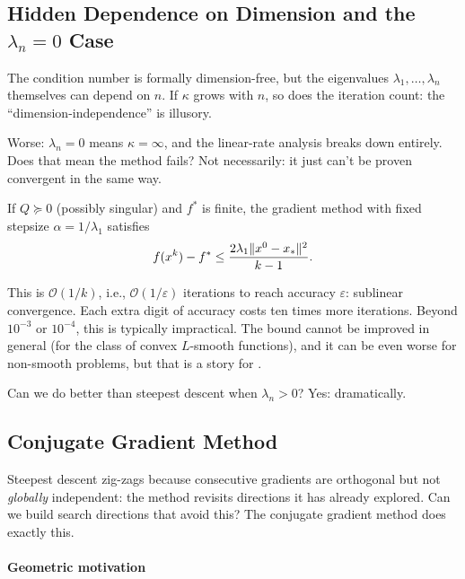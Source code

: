 \subsection{Hidden Dependence on Dimension and the \texorpdfstring{$\lambda_n = 0$}{λₙ = 0} Case}\label{sec:lambda-n-zero}

The condition number is formally dimension-free, but the eigenvalues $\lambda_1, \dots, \lambda_n$ themselves can depend on $n$.
If $\kappa$ grows with $n$, so does the iteration count: the ``dimension-independence'' is illusory.

Worse: $\lambda_n = 0$ means $\kappa = \infty$, and the linear-rate analysis breaks down entirely.
Does that mean the method fails?
Not necessarily: it just can't be proven convergent in the same way.

\begin{theorem}[Sublinear convergence for $\lambda_n = 0$]\label{thm:sublinear-quad}
	If $Q \succeq 0$ (possibly singular) and $f^*$ is finite, the gradient method with fixed stepsize $\alpha = 1/\lambda_1$ satisfies \cite{bubeck2015}
	\begin{equation}\label{eq:sublinear-quad}
		f(x^k) - f^* \leq \frac{2 \lambda_1 \lVert x^0 - x_*\rVert^2}{k - 1}.
	\end{equation}
\end{theorem}

This is $\mathcal{O}(1/k)$, i.e., $\mathcal{O}(1/\varepsilon)$ iterations to reach accuracy $\varepsilon$: sublinear convergence.
Each extra digit of accuracy costs ten times more iterations.
Beyond $10^{-3}$ or $10^{-4}$, this is typically impractical.
The bound cannot be improved in general (for the class of convex $L$-smooth functions), and it can be even worse for non-smooth problems, but that is a story for .

Can we do better than steepest descent when $\lambda_n > 0$?
Yes: dramatically.


\subsection{Conjugate Gradient Method}\label{sec:conjugate-gradient}

Steepest descent zig-zags because consecutive gradients are orthogonal but not \emph{globally} independent: the method revisits directions it has already explored.
Can we build search directions that avoid this?
The conjugate gradient method does exactly this.

\paragraph{Geometric motivation}

